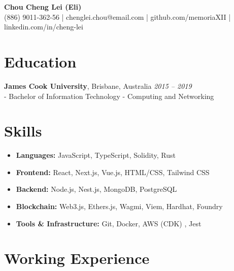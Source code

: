 \documentclass[11pt,a4paper]{article}
\begin{document}
\begin{center}
    {\huge \textbf{Chou Cheng Lei (Eli)}}\\
    \vspace{5pt}
    (886) 9011-362-56 | chenglei.chou@email.com | github.com/memoriaXII | linkedin.com/in/cheng-lei
\end{center}

\vspace{0pt}

\section{Education}
\textbf{James Cook University}, Brisbane, Australia \hfill \textit{2015 -- 2019}\\
- Bachelor of Information Technology - Computing and Networking\\

\vspace{0pt}


\section{Skills}
\begin{itemize}[leftmargin=1.5em, itemsep=0pt, topsep=0pt]
  \item \textbf{Languages:} JavaScript, TypeScript, Solidity, Rust
  \item \textbf{Frontend:} React, Next.js, Vue.js, HTML/CSS, Tailwind CSS
  \item \textbf{Backend:} Node.js, Nest.js, MongoDB, PostgreSQL
  \item \textbf{Blockchain:} Web3.js, Ethers.js, Wagmi, Viem, Hardhat, Foundry
  \item \textbf{Tools \& Infrastructure:} Git, Docker, AWS (CDK) , Jest
\end{itemize}

\vspace{0pt}

\section{Working Experience}
\end{document}
